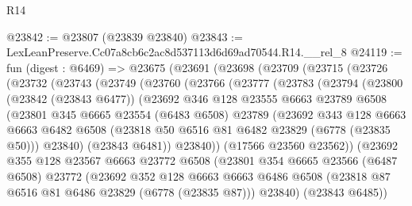 \begin{lexlean}{R14}
\begin{coremodule}
@23842 := @23807 (@23839 @23840)
@23843 := LexLeanPreserve.Cc07a8cb6c2ac8d537113d6d69ad70544.R14.__rel_8
@24119 := fun (digest : @6469) =>
  @23675
    (@23691
      (@23698
        (@23709
          (@23715
            (@23726
              (@23732
                (@23743
                  (@23749
                    (@23760
                      (@23766
                        (@23777
                          (@23783
                            (@23794
                              (@23800
                                (@23842 (@23843 @6477))
                                (@23692
                                  @346
                                  @128
                                  @23555
                                  @6663
                                  @23789
                                  @6508
                                  (@23801
                                    @345
                                    @6665
                                    @23554
                                    (@6483 @6508)
                                    @23789
                                    (@23692
                                      @343
                                      @128
                                      @6663
                                      @6663
                                      @6482
                                      @6508
                                      (@23818 @50 @6516 @81 @6482 @23829 (@6778 (@23835 @50)))
                                      @23840)
                                    (@23843 @6481))
                                  @23840))
                              (@17566 @23560 @23562))
                            (@23692
                              @355
                              @128
                              @23567
                              @6663
                              @23772
                              @6508
                              (@23801
                                @354
                                @6665
                                @23566
                                (@6487 @6508)
                                @23772
                                (@23692
                                  @352
                                  @128
                                  @6663
                                  @6663
                                  @6486
                                  @6508
                                  (@23818 @87 @6516 @81 @6486 @23829 (@6778 (@23835 @87)))
                                  @23840)
                                (@23843 @6485))

\end{coremodule}
\end{lexlean}
